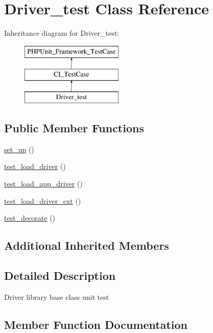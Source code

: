 \hypertarget{class_driver__test}{}\section{Driver\+\_\+test Class Reference}
\label{class_driver__test}
Inheritance diagram for Driver\+\_\+test\+:\begin{figure}[H]
\begin{center}
\leavevmode
\includegraphics[height=3.000000cm]{class_driver__test}
\end{center}
\end{figure}
\subsection*{Public Member Functions}
\begin{DoxyCompactItemize}
\item 
\hyperlink{class_driver__test_a69829875c8d4b6ce94908445c4155741}{set\+\_\+up} ()
\item 
\hyperlink{class_driver__test_acee5fa3c8f3221ef2fb00734857ba257}{test\+\_\+load\+\_\+driver} ()
\item 
\hyperlink{class_driver__test_ae58c7e14c97b0ed2904d2c98691a06c7}{test\+\_\+load\+\_\+app\+\_\+driver} ()
\item 
\hyperlink{class_driver__test_a126c903df16d3d2e47eba7aef1e8e1af}{test\+\_\+load\+\_\+driver\+\_\+ext} ()
\item 
\hyperlink{class_driver__test_a1146ba2b840907c8829882d66257a0cf}{test\+\_\+decorate} ()
\end{DoxyCompactItemize}
\subsection*{Additional Inherited Members}


\subsection{Detailed Description}
Driver library base class unit test 

\subsection{Member Function Documentation}
\hypertarget{class_driver__test_a69829875c8d4b6ce94908445c4155741}{}
